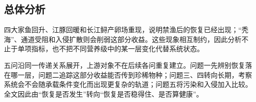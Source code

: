 \subsection{总体分析}
四大家鱼回升、江豚回暖和长江鲟产卵场重现，说明禁渔后的恢复已经出现；“秃海”、通道受阻和入侵扩散则会削弱这部分收益。这些现象相互制约，因此分析不止于单项指标，也不把不同营养级中的某一层变化代替系统状态。

五问沿同一传递关系展开，上游对象不在后续各问重复建立。问题一先辨别恢复落在哪一层，问题二追踪这部分收益能否传到珍稀物种；问题三、四转向长期，考察系统会不会随承载条件变化而出现更复杂的轨道；问题五将污染和入侵加入比较。全文因此由“恢复是否发生”转向“恢复是否稳得住、是否算健康”。

